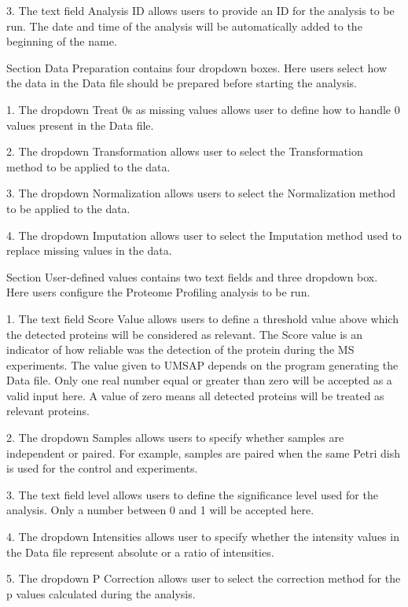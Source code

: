 \num{3}. The text field Analysis ID allows users to provide an ID for the analysis
to be run. The date and time of the analysis will be automatically added to the
beginning of the name.

Section Data Preparation contains four dropdown boxes. Here users select how the data
in the Data file should be prepared before starting the analysis.

\num{1}. The dropdown Treat \num{0}s as missing values allows user to define how
to handle \num{0} values present in the Data file.

\num{2}. The dropdown Transformation allows user to select the Transformation method
to be applied to the data.

\num{3}. The dropdown Normalization allows users to select the Normalization method
to be applied to the data.

\num{4}. The dropdown Imputation allows user to select the Imputation method used
to replace missing values in the data.

Section User-defined values contains two text fields and three dropdown box. Here
users configure the Proteome Profiling analysis to be run.

\num{1}. The text field Score Value\label{par:protprofScoreValue} allows users to
define a threshold value above which the detected proteins will be considered as
relevant. The Score value is an indicator of how reliable was the detection of
the protein during the MS experiments. The value given to UMSAP depends on the program
generating the Data file. Only one real number equal or greater than zero will be
accepted as a valid input here. A value of zero means all detected proteins will be
treated as relevant proteins.

\num{2}. The dropdown Samples allows users to specify whether samples are independent
or paired. For example, samples are paired when the same Petri dish is used for the
control and experiments.

\num{3}. The text field \alpha level allows users to define the significance level
used for the analysis. Only a number between \num{0} and \num{1} will be accepted
here.

\num{4}. The dropdown Intensities allows user to specify whether the intensity values
in the Data file represent absolute or a ratio of intensities.

\num{5}. The dropdown P Correction allows user to select the correction method for
the p values calculated during the analysis.

